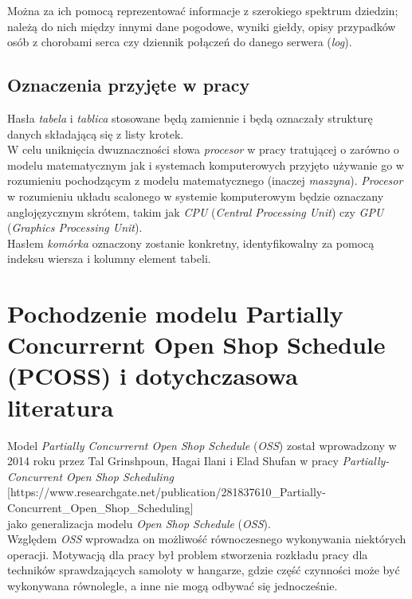 \documentclass[brudnopis]{xmgr}
\begin{document}
Można za ich pomocą reprezentować informacje z szerokiego spektrum dziedzin; należą do nich między innymi dane pogodowe, wyniki giełdy, opisy przypadków osób z chorobami serca czy dziennik połączeń do danego serwera (\emph{log}).

\section{Oznaczenia przyjęte w pracy}

Hasła \emph{tabela} i \emph{tablica} stosowane będą zamiennie i będą oznaczały strukturę danych składającą się z listy krotek. 
\medskip\\

W celu uniknięcia dwuznaczności słowa \emph{procesor} w pracy tratującej o zarówno o modelu matematycznym jak i systemach komputerowych przyjęto używanie go w rozumieniu pochodzącym z modelu matematycznego (inaczej \emph{maszyna}).
\emph{Procesor} w rozumieniu układu scalonego w systemie komputerowym będzie oznaczany anglojęzycznym skrótem, takim jak \emph{CPU} (\emph{Central Processing Unit}) czy \emph{GPU} (\emph{Graphics Processing Unit}).
\medskip\\

Hasłem \emph{komórka} oznaczony zostanie konkretny, identyfikowalny za pomocą indeksu wiersza i kolumny element tabeli.

\chapter{Pochodzenie modelu Partially Concurrernt Open Shop Schedule (PCOSS) i dotychczasowa literatura}

Model \emph{Partially Concurrernt Open Shop Schedule} (\emph{OSS}) został wprowadzony w 2014 roku przez Tal Grinshpoun, Hagai Ilani i Elad Shufan w pracy \emph{Partially-Concurrent Open Shop Scheduling} \\

[https://www.researchgate.net/publication/281837610\_Partially-Concurrent\_Open\_Shop\_Scheduling] \\

jako generalizacja modelu \emph{Open Shop Schedule} (\emph{OSS}). \\

Względem \emph{OSS} wprowadza on możliwość równoczesnego wykonywania niektórych operacji. Motywacją dla pracy był problem stworzenia rozkładu pracy dla techników sprawdzających samoloty w hangarze, gdzie część czynności może być wykonywana równolegle, a inne nie mogą odbywać się jednocześnie. 
\end{document}
